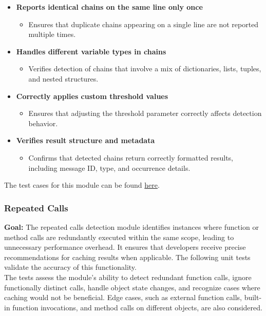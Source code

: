 \documentclass[12pt, titlepage]{article}
\begin{document}
\begin{enumerate}[label={\bf \textcolor{Maroon}{test-SRT-\arabic*}}, wide=0pt, font=\itshape]
\begin{itemize}
  \item \textbf{Reports identical chains on the same line only once}
  \begin{itemize}
      \item Ensures that duplicate chains appearing on a single line are not reported multiple times.
  \end{itemize}

  \item \textbf{Handles different variable types in chains}
  \begin{itemize}
      \item Verifies detection of chains that involve a mix of dictionaries, lists, tuples, and nested structures.
  \end{itemize}

  \item \textbf{Correctly applies custom threshold values}
  \begin{itemize}
      \item Ensures that adjusting the threshold parameter correctly affects detection behavior.
  \end{itemize}

  \item \textbf{Verifies result structure and metadata}
  \begin{itemize}
      \item Confirms that detected chains return correctly formatted results, including message ID, type, and occurrence details.
  \end{itemize}
\end{itemize}

\noindent The test cases for this module can be found \href{https://github.com/ssm-lab/capstone--source-code-optimizer/blob/new-poc/tests/analyzers/test_detect_lec.py}{here}.

\subsubsection{Repeated Calls}

\textbf{Goal:} The repeated calls detection module identifies instances where function or method calls are redundantly executed within the same scope, leading to unnecessary performance overhead. It ensures that developers receive precise recommendations for caching results when applicable. The following unit tests validate the accuracy of this functionality.\\ 

\noindent The tests assess the module’s ability to detect redundant function calls, ignore functionally distinct calls, handle object state changes, and recognize cases where caching would not be beneficial. Edge cases, such as external function calls, built-in function invocations, and method calls on different objects, are also considered. \\


\end{enumerate}
\end{document}
